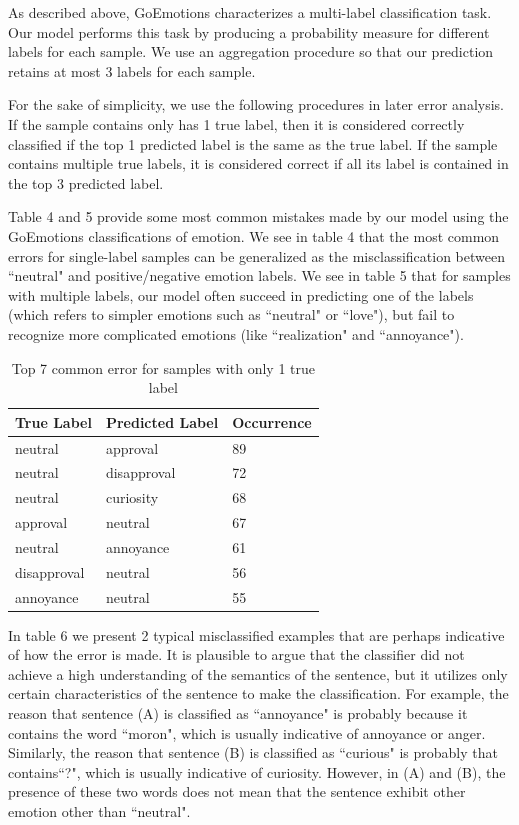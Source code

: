 \documentclass{article}
\begin{document}
As described above, GoEmotions characterizes a multi-label classification task. Our model performs this task by producing a probability measure for different labels for each sample. We use an aggregation procedure so that our prediction retains at most 3 labels for each sample. 

For the sake of simplicity, we use the following procedures in later error analysis. If the sample contains only has 1 true label, then it is considered correctly classified if the top 1 predicted label is the same as the true label. If the sample contains multiple true labels, it is considered correct if all its label is contained in the top 3 predicted label. 

Table 4 and 5 provide some most common mistakes made by our model using the GoEmotions classifications of emotion. We see in table 4 that the most common errors for single-label samples can be generalized as the misclassification between ``neutral" and positive/negative emotion labels. We see in table 5 that for samples with multiple labels, our model often succeed in predicting one of the labels (which refers to simpler emotions such as ``neutral" or ``love"), but fail to recognize more complicated emotions (like ``realization" and ``annoyance"). 


\begin{table}[h!]
\renewcommand\thetable{4}
\caption{Top 7 common error for samples with only 1 true label}
\centering
\begin{tabular}{l  l  l }
\hline\hline
True Label& Predicted Label & Occurrence  \\ [0.5ex]
\hline 
neutral  & approval  & 89\\
neutral  & disapproval  & 72\\
neutral  & curiosity  & 68\\
approval  & neutral  & 67\\
neutral  & annoyance  & 61\\
disapproval  & neutral  & 56\\
annoyance  & neutral  & 55\\[1ex]
\hline 
\end{tabular}
\label{table:nonlin} 
\end{table}

In table 6 we present 2 typical misclassified examples that are perhaps indicative of how the error is made. It is plausible to argue that the classifier did not achieve a high understanding of the semantics of the sentence, but it utilizes only certain characteristics of the sentence to make the classification. For example, the reason that sentence (A) is classified as ``annoyance" is probably because it contains the word ``moron", which is usually indicative of annoyance or anger. Similarly,  the reason that sentence (B) is classified as ``curious" is probably that contains``?", which is usually indicative of curiosity. However, in (A) and (B), the presence of these two words does not mean that the sentence exhibit other emotion other than ``neutral". 
\end{document}
